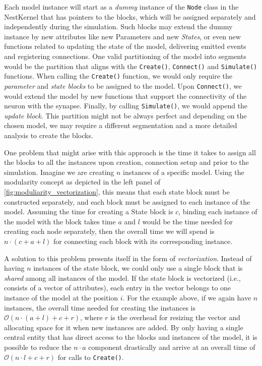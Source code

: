 Each model instance will start as a \emph{dummy} instance of the \texttt{Node} class in the NestKernel that has pointers to the blocks, which will be assigned separately and independently during the simulation. Such blocks may extend the dummy instance by new attributes like new Parameters and new \emph{States}, or even new functions related to updating the state of the model, delivering emitted events and registering connections. One valid partitioning of the model into segments would be the partition that aligns with the \texttt{Create()}, \texttt{Connect()} and \texttt{Simulate()} functions. When calling the \texttt{Create()} function, we would only require the \emph{parameter} and \emph{state blocks} to be assigned to the model. Upon \texttt{Connect()}, we would extend the model by new functions that support the connectivity of the neuron with the synapse. Finally, by calling \texttt{Simulate()}, we would append the \emph{update block}. This partition might not be always perfect and depending on the chosen model, we may require a different segmentation and a more detailed analysis to create the blocks. 

One problem that might arise with this approach is the time it takes to assign all the blocks to all the instances upon creation, connection setup and prior to the simulation. Imagine we are creating $n$ instances of a specific model. Using the modularity concept as depicted in the left panel of \autoref{fig:moduliarity_vectorization}, this  means that each state block must be constructed separately, and each block must be assigned to each instance of the model. Assuming the time for creating a State block is $c$, binding each instance of the model with the block takes time $a$ and $l$ would be the time needed for creating each node separately, then the overall time we will spend is $n \cdot (c + a + l)$ for connecting each block with its corresponding instance.

A solution to this problem presents itself in the form of \emph{vectorization}. Instead of having $n$ instances of the state block, we could only use a single block that is \emph{shared} among all instances of the model. If the state block is vectorized (i.e., consists of a vector of attributes), each entry in the vector belongs to one instance of the model at the position $i$. For the example above, if we again have $n$ instances, the overall time needed for creating the instances is $ \mathcal{O}(n \cdot (a + l) + c + r )$, where $r$ is the overhead for resizing the vector and allocating space for it when new instances are added. By only having a single central entity that has direct access to the blocks and instances of the model, it is possible to reduce the $n \cdot a$ component drastically and arrive at an overall time of $ \mathcal{O}(n \cdot l + c + r) $ for calls to \texttt{Create()}.

